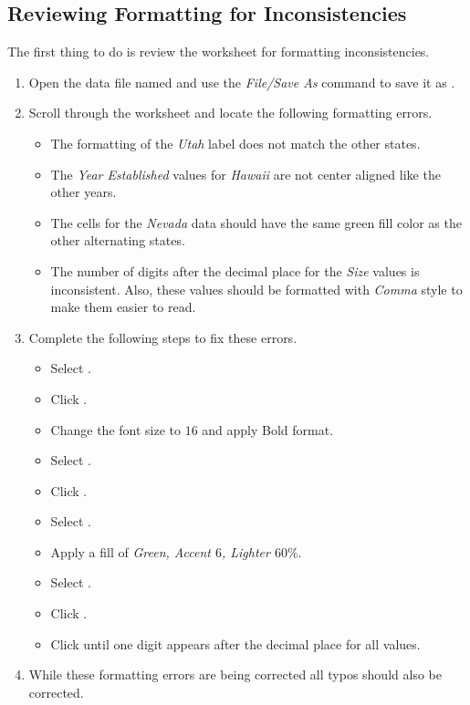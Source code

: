 \subsection{Reviewing Formatting for Inconsistencies}

The first thing to do is review the worksheet for formatting inconsistencies.

\begin{enumbox}
	\begin{enumerate}
		\item Open the data file named  and use the \textit{File/Save As} command to save it as .
		\item Scroll through the worksheet and locate the following formatting errors.
	
		\begin{itemize}
			\item The formatting of the \textit{Utah} label does not match the other states.
			\item The \textit{Year Established} values for \textit{Hawaii} are not center aligned like the other years.
			\item The cells for the \textit{Nevada} data should have the same green fill color as the other alternating states.
			\item The number of digits after the decimal place for the \textit{Size} values is inconsistent. Also, these values should be formatted with \textit{Comma} style to make them easier to read.
		\end{itemize}
	
		\item Complete the following steps to fix these errors.
	
		\begin{itemize}
			\item Select . 
			\item Click .
			\item Change the font size to $ 16 $ and apply Bold format.
			\item Select .
			\item Click .
			\item Select .
			\item Apply a fill of \textit{Green, Accent $ 6 $, Lighter $ 60\% $}.
			\item Select . 
			\item Click .
			\item Click  until one digit appears after the decimal place for all values.
		\end{itemize}
		
		\item While these formatting errors are being corrected all typos should also be corrected.
	\end{enumerate}
\end{enumbox}
	
